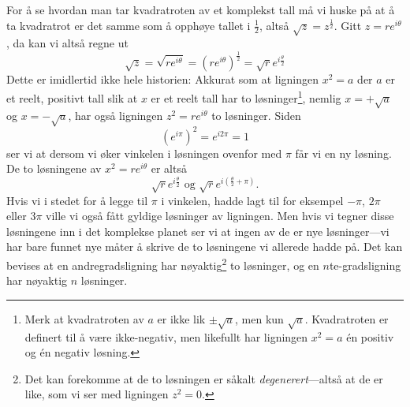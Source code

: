 \documentclass[a4paper,norsk,12pt]{article}
\begin{document}
For å se hvordan man tar kvadratroten av et komplekst tall må vi huske på at å ta kvadratrot er det samme som å opphøye tallet i $\frac12$, altså $\sqrt{z} = z^\frac12$. Gitt $z = re^{i\theta}$, da kan vi altså regne ut
\begin{displaymath}
	\sqrt{z} = \sqrt{re^{i\theta}} = \left(re^{i\theta}\right)^\frac12 = \sqrt{r}e^{i\frac{\theta}{2}}
\end{displaymath}
Dette er imidlertid ikke hele historien: Akkurat som at ligningen $x^2=a$ der $a$ er et reelt, positivt tall slik at $x$ er et reelt tall har to løsninger\footnote{Merk at kvadratroten av $a$ er ikke lik $\pm\sqrt{a}$, men kun $\sqrt{a}$. Kvadratroten er definert til å være ikke-negativ, men likefullt har ligningen $x^2=a$ \'en positiv og \'en negativ løsning.}, nemlig $x=+\sqrt{a}$ og $x =-\sqrt{a}$, har også ligningen $z^2=re^{i\theta}$ to løsninger. Siden 
\begin{displaymath}
	(e^{i\pi})^2 = e^{i2\pi} = 1
\end{displaymath}
ser vi at dersom vi øker vinkelen i løsningen ovenfor med $\pi$ får vi en ny løsning. De to løsningene av $x^2 = re^{i\theta}$ er altså
\begin{displaymath}
	\sqrt{r}e^{i\frac{\theta}{2}} \text{ og } \sqrt{r}e^{i\left(\frac{\theta}{2} + \pi\right)}.
\end{displaymath}
Hvis vi i stedet for å legge til $\pi$ i vinkelen, hadde lagt til for eksempel $-\pi$, $2\pi$ eller $3\pi$ ville vi også fått gyldige løsninger av ligningen. Men hvis vi tegner disse løsningene inn i det komplekse planet ser vi at ingen av de er nye løsninger---vi har bare funnet nye måter å skrive de to løsningene vi allerede hadde på. Det kan bevises at en andregradsligning har nøyaktig\footnote{Det kan forekomme at de to løsningen er såkalt \emph{degenerert}---altså at de er like, som vi ser med ligningen $z^2=0$.} to løsninger, og en $n$te-gradsligning har nøyaktig $n$ løsninger.
\end{document}
